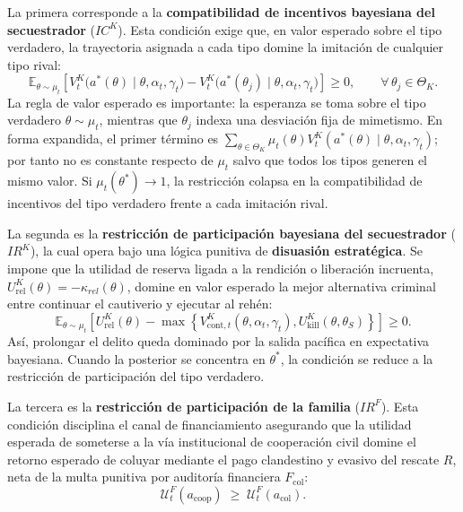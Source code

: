 \documentclass[12pt]{article}
\theoremstyle{definition}
\theoremstyle{remark}
\newcommand{\1}{\mathbf{1}}
\begin{document}
La primera corresponde a la \textbf{compatibilidad de incentivos bayesiana del secuestrador} ($IC^K$). Esta condición exige que, en valor esperado sobre el tipo verdadero, la trayectoria asignada a cada tipo domine la imitación de cualquier tipo rival:
\begin{equation}
\label{eq:ic-kidnapper}
\mathbb{E}_{\theta\sim\mu_t}
\left[
V^K_t\!\bigl(a^\ast(\theta)\mid \theta,\alpha_t,\gamma_t\bigr)
-
V^K_t\!\bigl(a^\ast(\theta_j)\mid \theta,\alpha_t,\gamma_t\bigr)
\right]
\ge 0,
\qquad \forall\,\theta_j\in\Theta_K.
\end{equation}
La regla de valor esperado es importante: la esperanza se toma sobre el tipo verdadero $\theta\sim\mu_t$, mientras que $\theta_j$ indexa una desviación fija de mimetismo. En forma expandida, el primer término es $\sum_{\theta\in\Theta_K}\mu_t(\theta)V^K_t(a^\ast(\theta)\mid\theta,\alpha_t,\gamma_t)$; por tanto no es constante respecto de $\mu_t$ salvo que todos los tipos generen el mismo valor. Si $\mu_t(\theta^\ast)\to1$, la restricción colapsa en la compatibilidad de incentivos del tipo verdadero frente a cada imitación rival.

La segunda es la \textbf{restricción de participación bayesiana del secuestrador} ($IR^K$), la cual opera bajo una lógica punitiva de \textbf{disuasión estratégica}. Se impone que la utilidad de reserva ligada a la rendición o liberación incruenta, $U^K_{\mathrm{rel}}(\theta)=-\kappa_{rel}(\theta)$, domine en valor esperado la mejor alternativa criminal entre continuar el cautiverio y ejecutar al rehén:
\begin{equation}
\label{eq:ir-K}
\mathbb{E}_{\theta\sim\mu_t}
\left[
U^K_{\mathrm{rel}}(\theta)
-
\max\left\{
V^K_{\mathrm{cont},t}(\theta,\alpha_t,\gamma_t),
U^K_{\mathrm{kill}}(\theta,\theta_S)
\right\}
\right]
\ge 0.
\end{equation}
Así, prolongar el delito queda dominado por la salida pacífica en expectativa bayesiana. Cuando la posterior se concentra en $\theta^\ast$, la condición se reduce a la restricción de participación del tipo verdadero.

La tercera es la \textbf{restricción de participación de la familia} ($IR^F$). Esta condición disciplina el canal de financiamiento asegurando que la utilidad esperada de someterse a la vía institucional de cooperación civil domine el retorno esperado de coluyar mediante el pago clandestino y evasivo del rescate $R$, neta de la multa punitiva por auditoría financiera $F_{\mathrm{col}}$:
\begin{equation}
\label{eq:ir-family}
\mathcal{U}^F_t(a_{\mathrm{coop}}) \;\geq\; \mathcal{U}^F_t(a_{\mathrm{col}}).
\end{equation}
\end{document}
